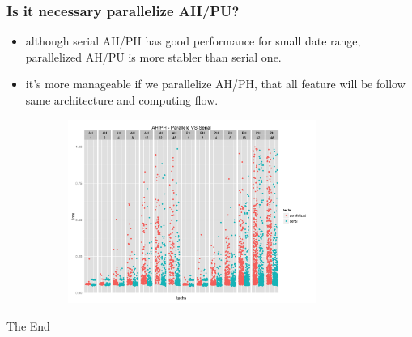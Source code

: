 \documentclass{beamer}
\begin{document}
\begin{frame}
\frametitle{Is it necessary parallelize AH/PU?}
\begin{itemize}
\item although serial AH/PH has good performance for small date range, parallelized AH/PU is more stabler than serial one.
\item it's more manageable if we parallelize AH/PH, that all feature will be follow same architecture and computing flow.
\end{itemize}
\begin{figure}
\includegraphics[width=10cm,height=6cm]{images/ah_ph_parallel_vs_serial.png}
\end{figure}
\end{frame}

\begin{frame}
\Huge{\centerline{The End}}
\end{frame}

\end{document}
